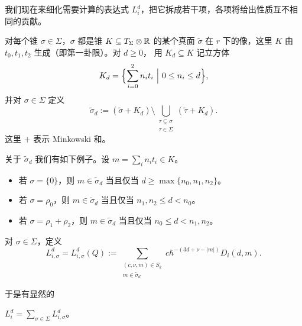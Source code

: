 
我们现在来细化需要计算的表达式 $L_i^d$，把它拆成若干项，各项将给出性质互不相同的贡献。

\begin{definition}
  对每个锥 $\sigma\in\Sigma$，$\sigma$ 都是锥 $K\subseteq T_\Sigma\otimes\mathbb{R}$ 的某个真面 $\tilde\sigma$ 在 $r$ 下的像，这里 $K$ 由 $t_0,t_1,t_2$ 生成（即第一卦限）。对 $d\ge 0$，
  用 $K_d\subseteq K$ 记立方体
  \[
    K_d=\Bigl\{\sum_{i=0}^2n_it_i\ \Big|\ 0\le n_i\le d\Bigr\},
  \]
  并对 $\sigma\in\Sigma$ 定义
  \[
    \tilde\sigma_d:=(\tilde\sigma+K_d)\setminus\bigcup_{\substack{\tau\subsetneq\sigma\\ \tau\in\Sigma}}(\tilde\tau+K_d).
  \]
  这里 $+$ 表示 Minkowski 和。
\end{definition}

\begin{example}
  关于 $\tilde\sigma_d$ 我们有如下例子。设 $m=\sum_in_it_i\in K$。
  \begin{itemize}[leftmargin=2em,itemsep=1pt]
    \item 若 $\sigma=\{0\}$，则 $m\in\tilde\sigma_d$ 当且仅当 $d\ge\max\{n_0,n_1,n_2\}$。
    \item 若 $\sigma=\rho_0$，则 $m\in\tilde\sigma_d$ 当且仅当 $n_1,n_2\le d<n_0$。
    \item 若 $\sigma=\rho_1+\rho_2$，则 $m\in\tilde\sigma_d$ 当且仅当 $n_0\le d<n_1,n_2$。
  \end{itemize}
\end{example}

\begin{definition}
  对 $\sigma\in\Sigma$，定义
  \[
    L_{i,\sigma}^d=L_{i,\sigma}^d(Q):=\sum_{\substack{(c,\nu,m)\in S_k\\ m\in\tilde\sigma_d}}
    c\hbar^{-(3d+\nu-|m|)}D_i(d,m).
  \]
\end{definition}

于是有显然的

\begin{lemma}
  $L_i^d=\sum_{\sigma\in\Sigma}L_{i,\sigma}^d$。
\end{lemma}

